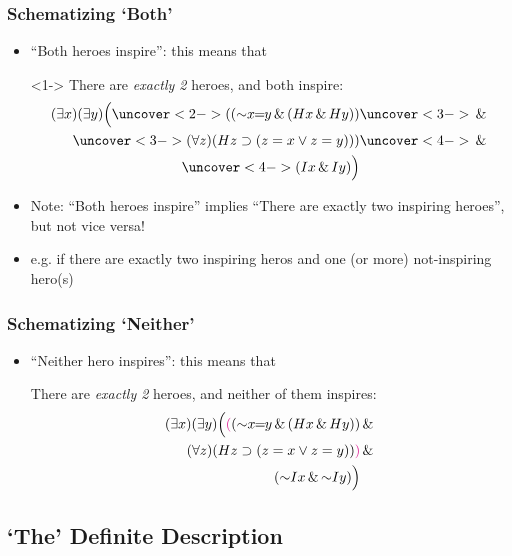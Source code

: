 \begin{frame}
    \frametitle{Schematizing `Both'}

\begin{itemize}
\item<1-> ``Both heroes inspire'': this means that 
\item[]<1-> There are \emph{exactly 2} heroes, and both inspire:
\begin{align*}
\qt{\exists}{x}\qt{\exists}{y}\Big(\uncover<2->{((\enot x\!\!=\!\!y \land (H\qv{x} \land H\qv{y}))} & 
\uncover<3->{{} \land {}}\\
\uncover<3->{\qt{\forall}{z}(H\qv{z} \to (z = x \lor z = y)))} & \uncover<4->{{}\land {}}\\
\uncover<4->{(I\qv{x} \eand I\qv{y})\Big)}&
\end{align*}
\item<5-> Note: ``Both heroes inspire'' implies ``There are exactly two inspiring heroes'', but not vice versa!
\item<6-> e.g. if there are exactly two inspiring heros and one (or more) not-inspiring hero(s)
\end{itemize}
\end{frame}

\begin{frame}
    \frametitle{Schematizing `Neither'}

\begin{itemize}[<+->]
\item ``Neither hero inspires'': this means that 
\item[] There are \emph{exactly 2} heroes, and neither of them inspires:
\begin{align*}
\qt{\exists}{x}\qt{\exists}{y}\Big(\textcolor{OGlyallpink}{(}(\lnot x\!\!=\!\!y \land (H\qv{x} \land H\qv{y})) & {}\land {}\\
\qt{\forall}{z}(H\qv{z} \to (z = x \lor z = y))\textcolor{OGlyallpink}{)} &{} \land {}\\
(\enot I\qv{x} \eand \enot I\qv{y})\Big)&
\end{align*}
\end{itemize}
\end{frame}

\subsection{`The' Definite Description}

